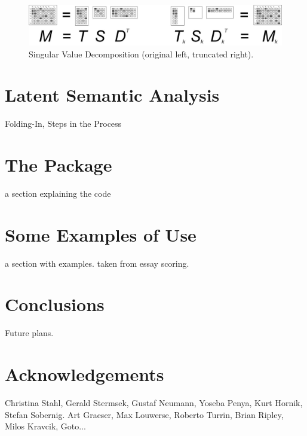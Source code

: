 \documentclass[article]{jss}
\begin{document}
  \begin{figure}
     \centering
     \label{fig:process}
     \includegraphics[width=140mm]{lsa_process.jpg}
     \caption{Singular Value Decomposition (original left, truncated right).}
  \end{figure}

\section[overview]{Latent Semantic Analysis}

Folding-In, Steps in the Process

\section[explaining code]{The  Package}

a section explaining the code

\section[examples]{Some Examples of Use}

a section with examples.
taken from essay scoring.

\section[conclusions]{Conclusions}

Future plans.

\section[acknowledgements]{Acknowledgements}

Christina Stahl, Gerald Stermsek, Gustaf Neumann, Yoseba Penya, Kurt Hornik, Stefan Sobernig.
Art Graeser, Max Louwerse, Roberto Turrin, Brian Ripley, Milos Kravcik, Goto...


\end{document}
